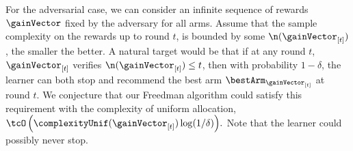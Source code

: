 For the adversarial case, we can consider
an infinite sequence of rewards $\gainVector$ fixed by 
the adversary for all arms.
% 
Assume that the sample complexity  on the rewards up to round $t$, 
is bounded by some $\n(\gainVector_{[t]})$, the smaller the better. 
A natural target would be that  %
if at any round $t$, 
$\gainVector_{[t]}$  verifies 
$\n(\gainVector_{[t]}) \leq t$, 
then with probability $1-\delta$, the learner can both 
stop and recommend the best arm $\bestArm_{\gainVector_{[t]}}$ 
at round $t$.
We conjecture that our Freedman algorithm could satisfy this 
requirement with the complexity of uniform allocation,
$\tcO\left(\complexityUnif(\gainVector_{[t]})\log(1/\delta)\right)\!.$ %
Note that the learner could possibly never stop. 
%
%
% 
%
%
%
